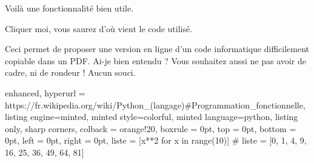 \documentclass[varwidth, border = 3pt]{standalone}
\begin{document}
Voilà une fonctionnalité bien utile.

%
%
\begin{tcolorbox}[
    enhanced,
    title    = Une boîte pointant vers l'extérieur,
    hyperurl = https://www.latex-project.org/news/2023/03/17/TLC3/,
]
    Cliquer moi, vous saurez d'où vient le code utilisé.
\end{tcolorbox}

Ceci permet de proposer une version en ligne d'un code informatique difficilement copiable dans un PDF. Ai-je bien entendu ? Vous souhaitez aussi ne pas avoir de cadre, ni de rondeur ! Aucun souci.

\begin{tcblisting}{
    enhanced,
    hyperurl = https://fr.wikipedia.org/wiki/Python_(langage)\#Programmation_fonctionnelle,
    listing engine=minted,
    minted style=colorful,
    minted language=python,
    listing only,
    sharp corners,
    colback  = orange!20,
    boxrule  = 0pt,
    top      = 0pt,
    bottom   = 0pt,
    left     = 0pt,
    right    = 0pt,
}
liste = [x**2 for x in range(10)]
# liste = [0, 1, 4, 9, 16, 25, 36, 49, 64, 81]
\end{tcblisting}
\end{document}
